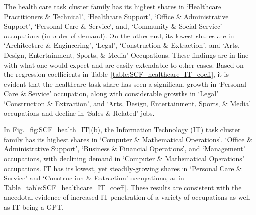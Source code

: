 \documentclass[letterpaper]{article} %
\begin{document}
The health care task cluster family has its highest shares in `Healthcare Practitioners \& Technical', `Healthcare Support', `Office \& Administrative Support', `Personal Care \& Service', and, `Community \& Social Service' occupations (in order of demand). On the other end, its lowest shares are in `Architecture \& Engineering', `Legal', `Construction \& Extraction', and `Arts, Design, Entertainment, Sports, \& Media' Occupations. These findings are in line with what one would expect and are easily extendable to other cases. Based on the regression coefficients in Table~\ref{table:SCF_healthcare_IT_coeff}, it is evident that the healthcare task-share has seen a significant growth in `Personal Care \& Service' occupation, along with considerable growths in `Legal', `Construction \& Extraction', and `Arts, Design, Entertainment, Sports, \& Media' occupations and decline in `Sales \& Related' jobs.

In Fig.~\ref{fig:SCF_health_IT}(b), the Information Technology (IT) task cluster family has its highest shares in `Computer \& Mathematical Operations', `Office \& Administrative Support', `Business \& Financial Operations', and `Management' occupations, with declining demand in `Computer \& Mathematical Operations' occupations. IT has its lowest, yet steadily-growing shares in `Personal Care \& Service' and `Construction \& Extraction' occupations, as in Table~\ref{table:SCF_healthcare_IT_coeff}. These results are consistent with the anecdotal evidence of increased IT penetration of a variety of occupations as well as IT being a GPT. 
\end{document}
